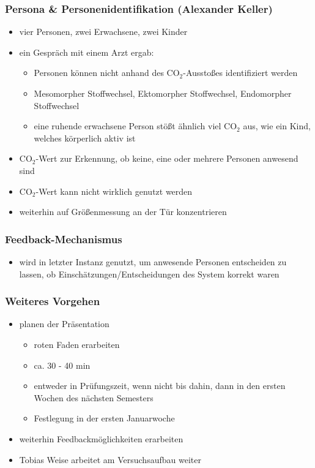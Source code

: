 \subsubsection{Persona \& Personenidentifikation (Alexander Keller)}

\begin{itemize}
	\item vier Personen, zwei Erwachsene, zwei Kinder
	\item ein Gespräch mit einem Arzt ergab:
	\begin{itemize}
		\item Personen können nicht anhand des CO$_2$-Ausstoßes identifiziert werden
		\item Mesomorpher Stoffwechsel, Ektomorpher Stoffwechsel, Endomorpher Stoffwechsel
		\item eine ruhende erwachsene Person stößt ähnlich viel CO$_2$ aus, wie ein Kind, welches körperlich aktiv ist
	\end{itemize}
	\item CO$_2$-Wert zur Erkennung, ob keine, eine oder mehrere Personen anwesend sind
	\item CO$_2$-Wert kann nicht wirklich genutzt werden
	\item weiterhin auf Größenmessung an der Tür konzentrieren
\end{itemize}

\subsubsection{Feedback-Mechanismus}

\begin{itemize}
	\item wird in letzter Instanz genutzt, um anwesende Personen entscheiden zu lassen, ob Einschätzungen/Entscheidungen des System korrekt waren
\end{itemize}

\subsubsection{Weiteres Vorgehen}

\begin{itemize}
	\item planen der Präsentation
	\begin{itemize}
		\item roten Faden erarbeiten
		\item ca. 30 - 40 min
		\item entweder in Prüfungszeit, wenn nicht bis dahin, dann in den ersten Wochen des nächsten Semesters
		\item Festlegung in der ersten Januarwoche
	\end{itemize}
	\item weiterhin Feedbackmöglichkeiten erarbeiten
	\item Tobias Weise arbeitet am Versuchsaufbau weiter
\end{itemize}

